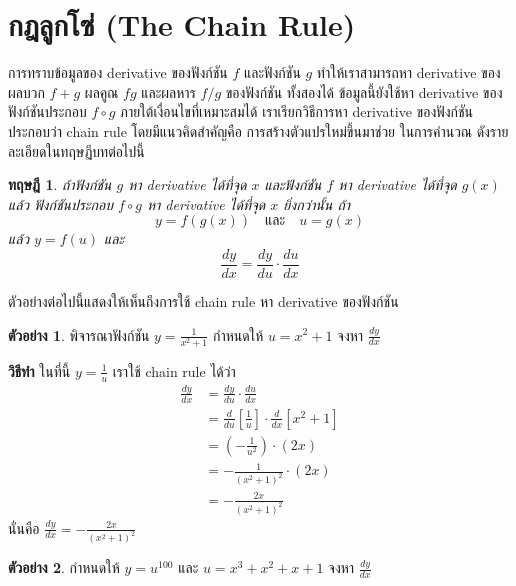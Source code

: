 \documentclass[
]{book}
\newtheorem{theorem}{ทฤษฎี}[chapter]
\theoremstyle{definition}
\theoremstyle{definition}
\newtheorem{example}{ตัวอย่าง}[chapter]
\theoremstyle{definition}
\theoremstyle{definition}
\theoremstyle{remark}
\begin{document}
\section{กฎลูกโซ่ (The Chain Rule)}\label{uxe01uxe0euxe25uxe01uxe42uxe0b-the-chain-rule}

การทราบข้อมูลของ derivative ของฟังก์ชัน \(f\) และฟังก์ชัน \(g\) ทำให้เราสามารถหา
derivative ของผลบวก \(f+g\) ผลคูณ \(fg\) และผลหาร \(f/g\) ของฟังก์ชัน ทั้งสองได้
ข้อมูลนี้ยังใช้หา derivative ของฟังก์ชันประกอบ \(f\circ g\) ภายใต้เงื่อนไขที่เหมาะสมได้
เราเรียกวิธีการหา derivative ของฟังก์ชัน ประกอบว่า chain rule โดยมีแนวคิดสำคัญคือ
การสร้างตัวแปรใหม่ขึ้นมาช่วย ในการคำนวณ ดังรายละเอียดในทฤษฏีบทต่อไปนี้

\begin{theorem}
ถ้าฟังก์ชัน \(g\) หา derivative ได้ที่จุด \(x\) และฟังก์ชัน \(f\) หา derivative ได้ที่จุด
\(g(x)\) แล้ว ฟังก์ชันประกอบ \(f \circ g\) หา derivative ได้ที่จุด \(x\) ยิ่งกว่านั้น ถ้า
\[y = f(g(x)) \quad \text{และ} \quad u = g(x)\] แล้ว \(y=f(u)\) และ
\[\label{E:chain1}
\boxed{
    \frac{dy}{dx} = \frac{dy}{du} \cdot \frac{du}{dx}
}\]
\end{theorem}

ตัวอย่างต่อไปนี้แสดงให้เห็นถึงการใช้ chain rule หา derivative ของฟังก์ชัน

\begin{example}
พิจารณาฟังก์ชัน \(y = \frac{1}{x^2+1}\) กำหนดให้ \(u = x^2+1\) จงหา
\(\frac{dy}{dx}\)
\end{example}

\textbf{วิธีทำ} ในที่นี้ \(y = \frac{1}{u}\) เราใช้ chain rule ได้ว่า \begin{equation}   \begin{aligned}
    \frac{dy}{dx}
    &= \frac{dy}{du} \cdot \frac{du}{dx} \\
    &= \frac{d}{du}\left[\frac{1}{u}\right] \cdot \frac{d}{dx}[x^2+1] \\
    &= \left(-\frac{1}{u^2}\right) \cdot (2x) \\
    &= -\frac{1}{(x^2+1)^2} \cdot (2x) \\
    &= -\frac{2x}{(x^2+1)^2}
  \end{aligned} \end{equation} นั่นคือ
\(\displaystyle \frac{dy}{dx} = -\frac{2x}{(x^2+1)^2}\)

\begin{example}
กำหนดให้ \(y = u^{100}\) และ \(u = x^3 + x^2 + x + 1\) จงหา \(\frac{dy}{dx}\)
\end{example}
\end{document}
